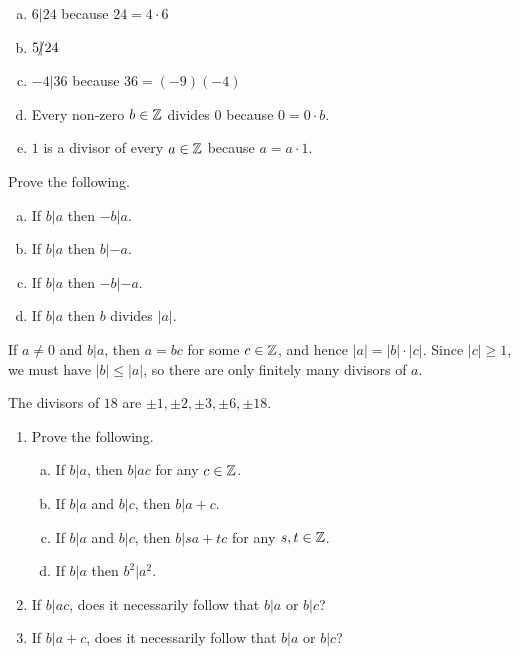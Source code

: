 \documentclass[11pt,fleqn,dvipsnames,usenames]{article}
\begin{document}
\examples
\begin{enumerate}[(a)]
\item $6 | 24$ because $24 = 4\cdot 6$
\item $5|\kern-0.9ex{/} 24$
\item $-4 | 36$ because $36 = (-9)(-4)$
\item Every non-zero $b\in\mathbb{Z}$ divides $0$ because $0 = 0\cdot b$.
\item $1$ is a divisor of every $a\in\mathbb{Z}$ because $a = a\cdot 1$.
\end{enumerate}

\begin{exercise} Prove the following.
\begin{enumerate}[(a)]
\item If $b|a$ then $-b|a$.
\item If $b|a$ then $b|-a$.
\item If $b|a$ then $-b|-a$.
\item If $b|a$ then $b$ divides $|a|$.
\end{enumerate}
\end{exercise}

\begin{remark}
If $a\neq 0$ and $b|a$, then $a = bc$ for some $c\in\mathbb{Z}$, and hence $|a| = |b|\cdot |c|$.  Since $|c|\geq 1$, we must have $|b|\leq |a|$, so there are only finitely many divisors of $a$.
\end{remark}

\begin{example}
The divisors of $18$ are $\pm1, \pm2,\pm3,\pm6,\pm18$.
\end{example}

\exercises
\begin{enumerate}
\item Prove the following.
\begin{enumerate}[(a)]
\item If $b|a$, then $b|ac$ for any $c\in\mathbb{Z}$.
\item If $b|a$ and $b|c$, then $b|a+c$.
\item If $b|a$ and $b|c$, then $b|sa+tc$ for any $s,t\in\mathbb{Z}$.
\item If $b|a$ then $b^2|a^2$.
\end{enumerate}
\item If $b|ac$, does it necessarily follow that $b|a$ or $b|c$?
\item If $b|a+c$, does it necessarily follow that $b|a$ or $b|c$? 
\end{enumerate}
\end{document}
